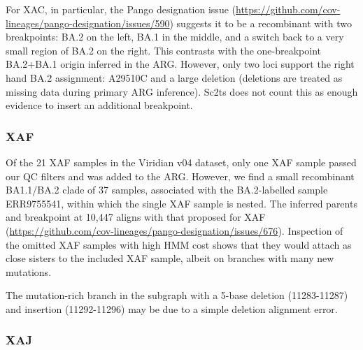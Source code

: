 \documentclass[12pt]{article}
\begin{document}
For XAC, in particular, the Pango designation issue
(\url{https://github.com/cov-lineages/pango-designation/issues/590}) suggests
it to be a recombinant with two breakpoints:
BA.2 on the left, BA.1 in the middle, and
a switch back to a very small region of BA.2 on the right.
This contrasts with the one-breakpoint BA.2+BA.1 origin inferred in the ARG.
However, only two loci support the right hand BA.2 assignment:
A29510C and a large deletion
(deletions are treated as missing data during primary ARG inference).
Sc2ts does not count this as enough evidence
to insert an additional breakpoint.


\subsubsection{XAF}
\label{sec:dd_xaf}

Of the 21 XAF samples in the Viridian v04 dataset,
only one XAF sample passed our QC filters and was added to the ARG.
However, we find a small recombinant BA1.1/BA.2 clade of 37 samples,
associated with the BA.2-labelled sample ERR9755541,
within which the single XAF sample is nested.
The inferred parents and breakpoint at 10,447
aligns with that proposed for XAF
(\url{https://github.com/cov-lineages/pango-designation/issues/676}).
Inspection of the omitted XAF samples with high HMM cost shows that
they would attach as close sisters to the included XAF sample,
albeit on branches with many new mutations.

The mutation-rich branch in the subgraph with
a 5-base deletion (11283-11287) and insertion (11292-11296)
may be due to a simple deletion alignment error.


\subsubsection{XAJ}
\label{sec:dd_xaj}
\end{document}
